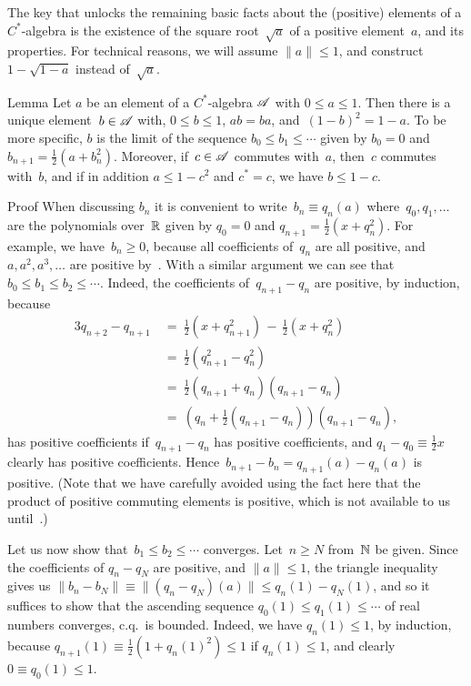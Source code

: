 \documentclass[a]{subfiles}
\begin{document}
\begin{parsec}%
\begin{point}%
The key that unlocks the remaining basic facts 
about the (positive) elements of a  $C^*$-algebra
is the existence of the square root~$\sqrt{a}$ of a positive element~$a$,
and its properties.
For technical reasons,
we will assume $\|a\|\leq 1$,
and construct
 $1-\sqrt{1-a}$ instead of~$\sqrt{a}$.
\end{point}
\begin{point}{Lemma}%
Let $a$ be an element of a $C^*$-algebra $\mathscr{A}$
with $0\leq a\leq 1$.
Then there is a unique element~$b\in\mathscr{A}$ 
with, $0\leq b\leq 1$,
$ab=ba$,
and~$(1-b)^2 = 1-a$.
To be more specific,
$b$ is the limit of
the sequence $b_0\leq b_1\leq \dotsb$
given by $b_0=0$ and $b_{n+1} = \frac{1}{2}(a+b_n^2)$.
Moreover,
if~$c\in\mathscr{A}$ commutes with~$a$, then~$c$ commutes with~$b$,
and if in addition $a\leq 1-c^2$ and $c^*=c$,
we have $b\leq 1-c$.
\begin{point}{Proof}%
When discussing $b_n$ it 
is convenient to write~$b_n \equiv q_n(a)$
where~$q_0,q_1,\dotsc$ are the polynomials over~$\mathbb{R}$ given by
$q_0=0$ and $q_{n+1}=\frac{1}{2}(x + q_n^2)$.
For example,
we have~$b_n\geq 0$, 
because all coefficients of~$q_n$ are all positive,
and $a,a^2,a^3,\dotsc$ are positive by~.
With a similar argument we can see that
 $b_0 \leq b_1\leq b_2\leq \dotsb$.
Indeed, 
the coefficients of~$q_{n+1}-q_n$
are positive,
by induction,
because
\begin{alignat*}{3}
q_{n+2}-q_{n+1} \ &=\ \textstyle \frac{1}{2}(x+ q_{n+1}^2)
\,-\, \textstyle\frac{1}{2}(x+q_n^2) \\
&=\ \textstyle\frac{1}{2}(q_{n+1}^2- q_n^2) \\
&=\ \textstyle\frac{1}{2}(q_{n+1}+q_n)(q_{n+1}-q_n) \\
&=\ (q_n+\textstyle\frac{1}{2}(q_{n+1}-q_n))(q_{n+1}-q_n),
\end{alignat*}
has positive coefficients
if~$q_{n+1}-q_n$ has positive coefficients,
and $q_1-q_0\equiv \frac{1}{2}x$ clearly has positive coefficients.
Hence~$b_{n+1}-b_{n} = q_{n+1}(a)- q_n(a)$ is positive.
(Note that we have carefully avoided
using the fact here that the product of positive 
commuting elements is positive,
which is not available to us until~.)

Let us now show that~$b_1\leq b_2\leq \dotsb$ converges.
Let~$n\geq N$ from~$\mathbb{N}$ be given.
Since the coefficients of $q_n-q_N$ are positive,
and $\|a\|\leq 1$,
the triangle inequality gives us
$\|b_n-b_N\|\equiv \|(q_n-q_N)(a)\|\leq q_n(1)-q_N(1)$,
and
so it suffices to 
show that the ascending sequence
 $q_0(1)\leq q_1(1)\leq \dotsb$
of real numbers
converges,
c.q.~is bounded.
Indeed,
we have $q_n(1)\leq 1$,
by induction,
because $q_{n+1}(1)\equiv \frac{1}{2}(1+q_n(1)^2)
\leq 1$ if $q_n(1)\leq 1$,
and clearly $0\equiv q_0(1)\leq 1$.


\end{point}
\end{point}
\end{parsec}
\end{document}
